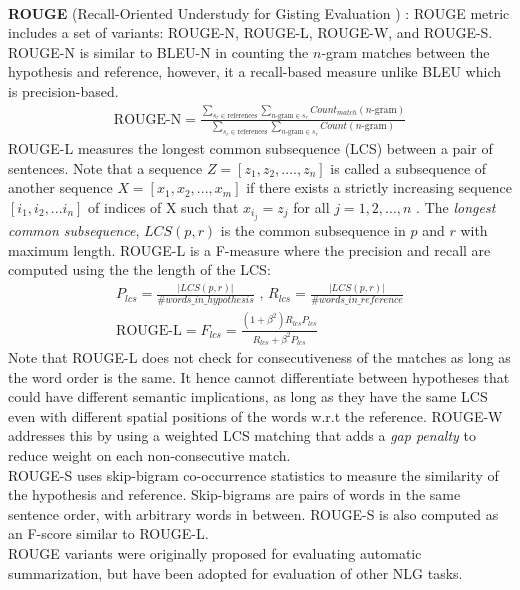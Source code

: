 \\
\textbf{ROUGE} (Recall-Oriented Understudy for Gisting Evaluation ) : 
ROUGE metric includes a set of variants: ROUGE-N, ROUGE-L, ROUGE-W, and ROUGE-S. ROUGE-N is similar to BLEU-N in counting the $n$-gram matches between the hypothesis and reference, however, it a recall-based measure unlike BLEU which is precision-based.
\begin{align*}
    \text{ROUGE-N}  = \frac{\sum\limits_{s_r \in \text{references}} \sum\limits_{\text{$n$-gram} \in s_r} Count_{match}(\text{$n$-gram})}{\sum\limits_{s_r \in \text{references}} \sum\limits_{\text{$n$-gram} \in s_r} Count(\text{$n$-gram})}
\end{align*}
ROUGE-L measures the longest common subsequence (LCS) between a pair of sentences. Note that a sequence $Z = [z_1, z_2, ...., z_n]$ is called a subsequence of another sequence $X = [x_1, x_2, ..., x_m]$ if there exists a strictly increasing sequence $[i_1, i_2, ... i_n]$ of indices of X such that $x_{i_j} = z_j$ for all $j=1,2,...,n$ . The \textit{longest common subsequence}, $LCS(p,r)$ is the common subsequence in $p$ and $r$ with maximum length. ROUGE-L is a F-measure where the precision and recall are computed using the the length of the LCS:
\begin{gather*}
    P_{lcs} = \frac{|LCS(p,r)|}{\# words\_in\_hypothesis} \text{ , } R_{lcs} = \frac{|LCS(p,r)|}{\# words\_in\_reference}
    \\
    \text{ROUGE-L} = F_{lcs} = \frac{(1+\beta^2)R_{lcs}P_{lcs}}{R_{lcs} + \beta^2 P_{lcs}}
\end{gather*}
Note that ROUGE-L does not check for consecutiveness of the matches as long as the word order is the same. It hence cannot differentiate between hypotheses that could have different semantic implications, as long as they have the same LCS even with different spatial positions of the words w.r.t the reference. ROUGE-W addresses this by using a weighted LCS matching that adds a \textit{gap penalty} to reduce weight on each non-consecutive match.\\
ROUGE-S uses skip-bigram co-occurrence statistics to measure the similarity of the hypothesis and reference. Skip-bigrams are pairs of words in the same sentence order, with arbitrary words in between. ROUGE-S is also computed as an F-score similar to ROUGE-L.\\
ROUGE variants were originally proposed for evaluating automatic summarization, but have been adopted for evaluation of other NLG tasks.\\  
